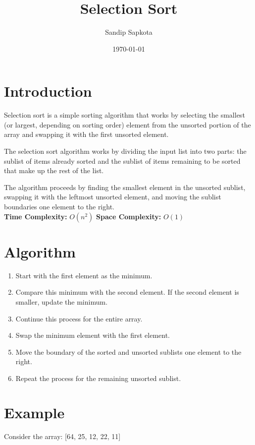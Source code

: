 \documentclass{article}
\begin{document}
\title{Selection Sort}
\author{Sandip Sapkota}
\date{\today}
\maketitle

\section*{Introduction}
Selection sort is a simple sorting algorithm that works by selecting the smallest (or largest, depending on sorting order) element from the unsorted portion of the array and swapping it with the first unsorted element.

The selection sort algorithm works by dividing the input list into two parts: the sublist of items already sorted and the sublist of items remaining to be sorted that make up the rest of the list.

The algorithm proceeds by finding the smallest element in the unsorted sublist, swapping it with the leftmost unsorted element, and moving the sublist boundaries one element to the right.\\
\textbf{Time Complexity:} $O(n^2)$  \hspace{1cm} \textbf{Space Complexity:} $O(1)$

\section*{Algorithm}
\begin{enumerate}
  \item Start with the first element as the minimum.
  \item Compare this minimum with the second element. If the second element is smaller, update the minimum.
  \item Continue this process for the entire array.
  \item Swap the minimum element with the first element.
  \item Move the boundary of the sorted and unsorted sublists one element to the right.
  \item Repeat the process for the remaining unsorted sublist.
\end{enumerate}

\section*{Example}
Consider the array: [64, 25, 12, 22, 11]
\end{document}
